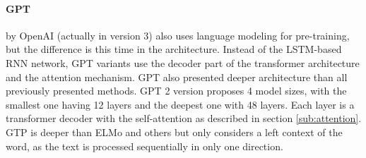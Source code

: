 \paragraph{GPT} by OpenAI (actually in version 3) also uses language modeling for pre-training, but the difference is this time in the architecture. Instead of the LSTM-based RNN network, GPT variants use the decoder part of the transformer architecture and the attention mechanism. GPT also presented deeper architecture than all previously presented methods. GPT 2 version proposes 4 model sizes, with the smallest one having 12 layers and the deepest one with 48 layers. Each layer is a transformer decoder with the self-attention as described in section \ref{sub:attention}. GTP is deeper than ELMo and others but only considers a left context of the word, as the text is processed sequentially in only one direction.


